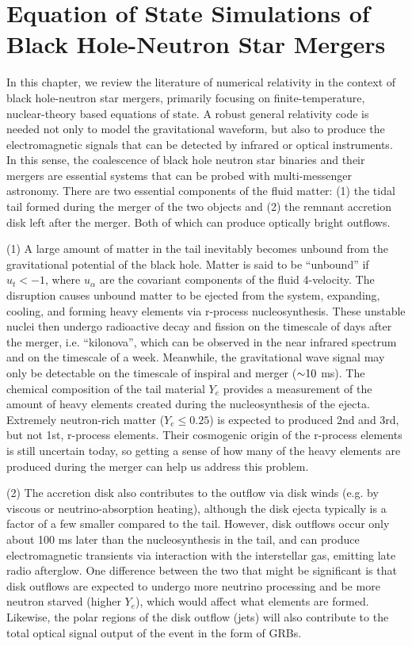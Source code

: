 \chapter{Equation of State Simulations of Black Hole-Neutron Star Mergers}
\label{chap:chapter-4}

In this chapter, we review the literature of numerical relativity in the context of black hole-neutron star mergers, primarily focusing on finite-temperature, nuclear-theory based equations of state.  
A robust general relativity code is needed not only to model the gravitational waveform, but also to produce the electromagnetic signals that can be detected by infrared or optical instruments.  
In this sense, the coalescence of black hole neutron star binaries and their mergers are essential systems that can be probed with multi-messenger astronomy.   
There are two essential components of the fluid matter: (1) the tidal tail formed during the merger of the two objects and (2) the remnant accretion disk left after the merger.  
Both of which can produce optically bright outflows.

(1) A large amount of matter in the tail inevitably becomes unbound from the gravitational potential of the black hole.  Matter is said to be ``unbound'' if $u_t < -1$, where $u_\alpha$ are the covariant components of the fluid 4-velocity.  
The disruption causes unbound matter to be ejected from the system, expanding, cooling, and forming heavy elements via r-process nucleosynthesis.
These unstable nuclei then undergo radioactive decay and fission on the timescale of days after the merger, i.e. ``kilonova'', which can be observed in the near infrared spectrum and on the timescale of a week.
Meanwhile, the gravitational wave signal may only be detectable on the timescale of inspiral and merger ($\mathord{\sim}10$ ms).
The chemical composition of the tail material $Y_e$ provides a measurement of the amount of heavy elements created during the nucleosynthesis of the ejecta. 
Extremely neutron-rich matter ($Y_e \le 0.25$) is expected to produced 2nd and 3rd, but not 1st, r-process elements.  
Their cosmogenic origin of the r-process elements is still uncertain today, so getting a sense of how many of the heavy elements are produced during the merger can help us address this problem.
  
(2)  The accretion disk also contributes to the outflow via disk winds (e.g. by viscous or neutrino-absorption heating), although the disk ejecta typically is a factor of a few smaller compared to the tail.
However, disk outflows occur only about 100 ms later than the nucleosynthesis in the tail, and can produce electromagnetic transients via interaction with the interstellar gas, emitting late radio afterglow.
One difference between the two that might be significant is that disk outflows are expected to undergo more neutrino processing and be more neutron starved (higher $Y_e$), which would affect what elements are formed.
Likewise, the polar regions of the disk outflow (jets) will also contribute to the total optical signal output of the event in the form of GRBs.

